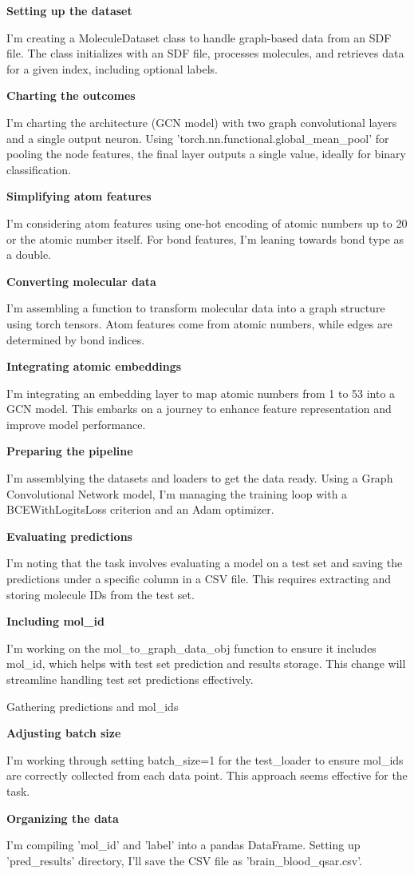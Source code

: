 \begin{tcolorbox}[title=Task: Train a graph convolutional network on the given dataset to predict the blood-brain barrier permeability of compounds.]
\textbf{Setting up the dataset}

I’m creating a MoleculeDataset class to handle graph-based data from an SDF file. The class initializes with an SDF file, processes molecules, and retrieves data for a given index, including optional labels.

\textbf{Charting the outcomes}

I’m charting the architecture (GCN model) with two graph convolutional layers and a single output neuron. Using 'torch.nn.functional.global\_mean\_pool' for pooling the node features, the final layer outputs a single value, ideally for binary classification.

\textbf{Simplifying atom features}

I'm considering atom features using one-hot encoding of atomic numbers up to 20 or the atomic number itself. For bond features, I'm leaning towards bond type as a double.

\textbf{Converting molecular data}

I’m assembling a function to transform molecular data into a graph structure using torch tensors. Atom features come from atomic numbers, while edges are determined by bond indices.

\textbf{Integrating atomic embeddings}

I'm integrating an embedding layer to map atomic numbers from 1 to 53 into a GCN model. This embarks on a journey to enhance feature representation and improve model performance.

\textbf{Preparing the pipeline}

I’m assemblying the datasets and loaders to get the data ready. Using a Graph Convolutional Network model, I’m managing the training loop with a BCEWithLogitsLoss criterion and an Adam optimizer.

\textbf{Evaluating predictions}

I’m noting that the task involves evaluating a model on a test set and saving the predictions under a specific column in a CSV file. This requires extracting and storing molecule IDs from the test set.

\textbf{Including mol\_id}

I'm working on the mol\_to\_graph\_data\_obj function to ensure it includes mol\_id, which helps with test set prediction and results storage. This change will streamline handling test set predictions effectively.

Gathering predictions and mol\_ids

\textbf{Adjusting batch size}

I’m working through setting batch\_size=1 for the test\_loader to ensure mol\_ids are correctly collected from each data point. This approach seems effective for the task.

\textbf{Organizing the data}

I'm compiling 'mol\_id' and 'label' into a pandas DataFrame. Setting up 'pred\_results' directory, I’ll save the CSV file as 'brain\_blood\_qsar.csv'.
\end{tcolorbox}